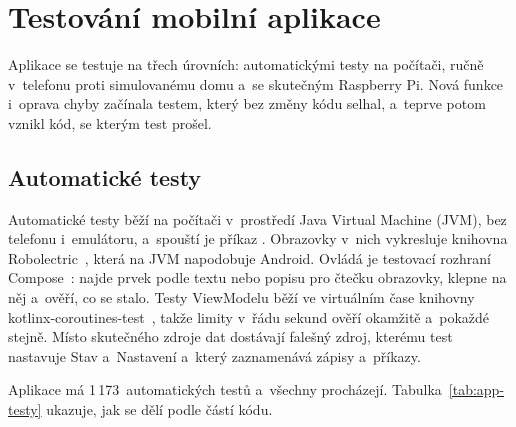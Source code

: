 \section{Testování mobilní aplikace}
\label{sec:testovani-aplikace}

Aplikace se testuje na třech úrovních: automatickými testy na počítači, ručně v~telefonu proti
simulovanému domu a~se skutečným Raspberry Pi. Nová funkce i~oprava chyby začínala testem,
který bez změny kódu selhal, a~teprve potom vznikl kód, se kterým test prošel.

\subsection{Automatické testy}

Automatické testy běží na počítači v~prostředí Java Virtual Machine (JVM), bez telefonu
i~emulátoru, a~spouští je příkaz . Obrazovky v~nich vykresluje
knihovna Robolectric~\cite{app-robolectric}, která na JVM napodobuje Android. Ovládá je testovací
rozhraní Compose~\cite{app-compose-testy}: najde prvek podle textu nebo popisu pro čtečku
obrazovky, klepne na něj a~ověří, co se stalo. Testy ViewModelu běží ve virtuálním čase knihovny
kotlinx-coroutines-test~\cite{app-coroutines-testy}, takže limity v~řádu sekund ověří okamžitě
a~pokaždé stejně. Místo skutečného zdroje dat dostávají falešný zdroj, kterému test nastavuje
Stav a~Nastavení a~který zaznamenává zápisy a~příkazy.

Aplikace má 1\,173~automatických testů a~všechny procházejí. Tabulka~\ref{tab:app-testy}
ukazuje, jak se dělí podle částí kódu.

